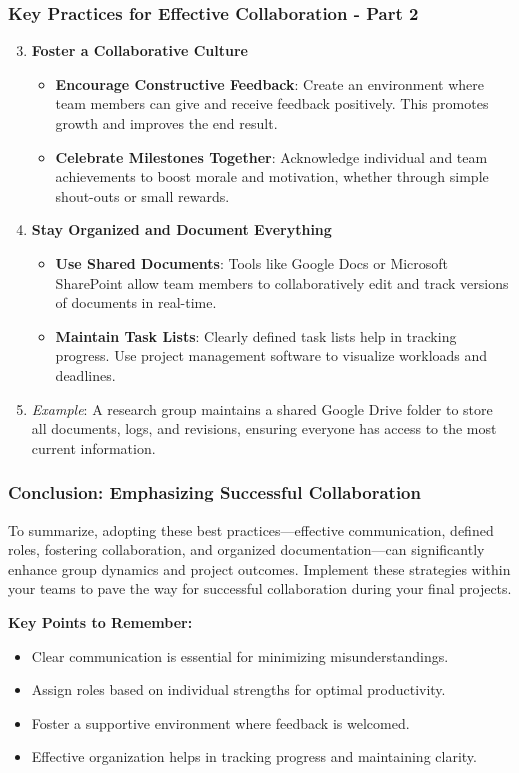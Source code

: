 \documentclass[aspectratio=169]{beamer}
\begin{document}
\begin{frame}[fragile]
    \frametitle{Key Practices for Effective Collaboration - Part 2}
    \begin{enumerate}
        \setcounter{enumi}{2} %
        \item \textbf{Foster a Collaborative Culture}
            \begin{itemize}
                \item \textbf{Encourage Constructive Feedback}: Create an environment where team members can give and receive feedback positively. This promotes growth and improves the end result.
                \item \textbf{Celebrate Milestones Together}: Acknowledge individual and team achievements to boost morale and motivation, whether through simple shout-outs or small rewards.
            \end{itemize}

        \item \textbf{Stay Organized and Document Everything}
            \begin{itemize}
                \item \textbf{Use Shared Documents}: Tools like Google Docs or Microsoft SharePoint allow team members to collaboratively edit and track versions of documents in real-time.
                \item \textbf{Maintain Task Lists}: Clearly defined task lists help in tracking progress. Use project management software to visualize workloads and deadlines.
            \end{itemize}
            \item \textit{Example}: A research group maintains a shared Google Drive folder to store all documents, logs, and revisions, ensuring everyone has access to the most current information.
    \end{enumerate}
\end{frame}

\begin{frame}[fragile]
    \frametitle{Conclusion: Emphasizing Successful Collaboration}
    To summarize, adopting these best practices—effective communication, defined roles, fostering collaboration, and organized documentation—can significantly enhance group dynamics and project outcomes. Implement these strategies within your teams to pave the way for successful collaboration during your final projects.

    \textbf{Key Points to Remember:}
    \begin{itemize}
        \item Clear communication is essential for minimizing misunderstandings.
        \item Assign roles based on individual strengths for optimal productivity.
        \item Foster a supportive environment where feedback is welcomed.
        \item Effective organization helps in tracking progress and maintaining clarity.
    \end{itemize}
\end{frame}
\end{document}
